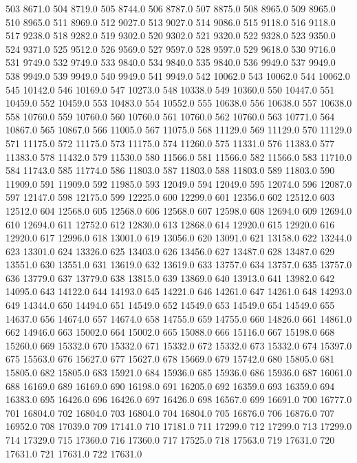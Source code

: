 503 8671.0
504 8719.0
505 8744.0
506 8787.0
507 8875.0
508 8965.0
509 8965.0
510 8965.0
511 8969.0
512 9027.0
513 9027.0
514 9086.0
515 9118.0
516 9118.0
517 9238.0
518 9282.0
519 9302.0
520 9302.0
521 9320.0
522 9328.0
523 9350.0
524 9371.0
525 9512.0
526 9569.0
527 9597.0
528 9597.0
529 9618.0
530 9716.0
531 9749.0
532 9749.0
533 9840.0
534 9840.0
535 9840.0
536 9949.0
537 9949.0
538 9949.0
539 9949.0
540 9949.0
541 9949.0
542 10062.0
543 10062.0
544 10062.0
545 10142.0
546 10169.0
547 10273.0
548 10338.0
549 10360.0
550 10447.0
551 10459.0
552 10459.0
553 10483.0
554 10552.0
555 10638.0
556 10638.0
557 10638.0
558 10760.0
559 10760.0
560 10760.0
561 10760.0
562 10760.0
563 10771.0
564 10867.0
565 10867.0
566 11005.0
567 11075.0
568 11129.0
569 11129.0
570 11129.0
571 11175.0
572 11175.0
573 11175.0
574 11260.0
575 11331.0
576 11383.0
577 11383.0
578 11432.0
579 11530.0
580 11566.0
581 11566.0
582 11566.0
583 11710.0
584 11743.0
585 11774.0
586 11803.0
587 11803.0
588 11803.0
589 11803.0
590 11909.0
591 11909.0
592 11985.0
593 12049.0
594 12049.0
595 12074.0
596 12087.0
597 12147.0
598 12175.0
599 12225.0
600 12299.0
601 12356.0
602 12512.0
603 12512.0
604 12568.0
605 12568.0
606 12568.0
607 12598.0
608 12694.0
609 12694.0
610 12694.0
611 12752.0
612 12830.0
613 12868.0
614 12920.0
615 12920.0
616 12920.0
617 12996.0
618 13001.0
619 13056.0
620 13091.0
621 13158.0
622 13244.0
623 13301.0
624 13326.0
625 13403.0
626 13456.0
627 13487.0
628 13487.0
629 13551.0
630 13551.0
631 13619.0
632 13619.0
633 13757.0
634 13757.0
635 13757.0
636 13779.0
637 13779.0
638 13815.0
639 13869.0
640 13913.0
641 13982.0
642 14095.0
643 14122.0
644 14193.0
645 14221.0
646 14261.0
647 14261.0
648 14293.0
649 14344.0
650 14494.0
651 14549.0
652 14549.0
653 14549.0
654 14549.0
655 14637.0
656 14674.0
657 14674.0
658 14755.0
659 14755.0
660 14826.0
661 14861.0
662 14946.0
663 15002.0
664 15002.0
665 15088.0
666 15116.0
667 15198.0
668 15260.0
669 15332.0
670 15332.0
671 15332.0
672 15332.0
673 15332.0
674 15397.0
675 15563.0
676 15627.0
677 15627.0
678 15669.0
679 15742.0
680 15805.0
681 15805.0
682 15805.0
683 15921.0
684 15936.0
685 15936.0
686 15936.0
687 16061.0
688 16169.0
689 16169.0
690 16198.0
691 16205.0
692 16359.0
693 16359.0
694 16383.0
695 16426.0
696 16426.0
697 16426.0
698 16567.0
699 16691.0
700 16777.0
701 16804.0
702 16804.0
703 16804.0
704 16804.0
705 16876.0
706 16876.0
707 16952.0
708 17039.0
709 17141.0
710 17181.0
711 17299.0
712 17299.0
713 17299.0
714 17329.0
715 17360.0
716 17360.0
717 17525.0
718 17563.0
719 17631.0
720 17631.0
721 17631.0
722 17631.0

